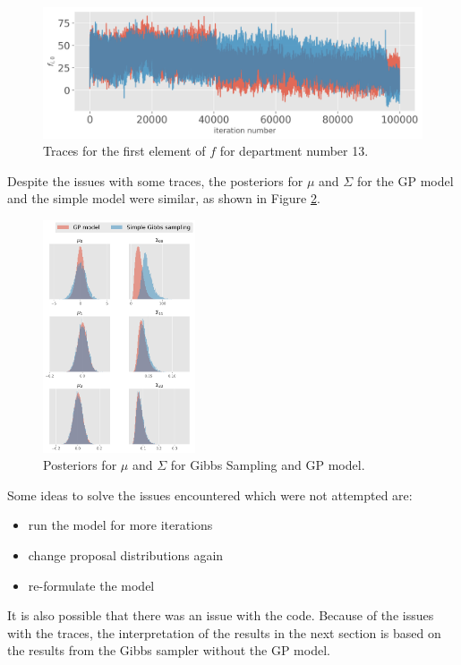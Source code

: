 \documentclass[paper=a4, fontsize=11pt]{scrartcl}
\begin{document}
\begin{figure}[!htb]\label{f}
\centering
\includegraphics[width=.8\textwidth]{project/writeup/f.png}
\caption{Traces for the first element of $f$ for department number 13.}\end{figure}

\newpage

Despite the issues with some traces, the posteriors for $\mu$ and $\Sigma$ for the GP model and the simple model were similar, as shown in Figure \ref{gibbs_gp}.\\


\begin{figure}[!htb]\label{gibbs_gp}
\centering
\includegraphics[width=0.4\textwidth]{project/writeup/compare_gibbs_gp.png}
\caption{Posteriors for $\mu$ and $\Sigma$ for Gibbs Sampling and GP model.}\end{figure}

\newpage
Some ideas to solve the issues encountered which were not attempted are:
\begin{itemize}[noitemsep]
    \item run the model for more iterations
    \item change proposal distributions again
    \item re-formulate the model
\end{itemize}
It is also possible that there was an issue with the code. Because of the issues with the traces, the interpretation of the results in the next section is based on the results from the Gibbs sampler without the GP model.
\end{document}
